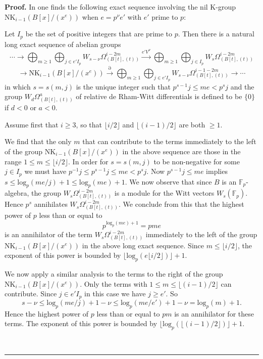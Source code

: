 \documentclass[reqno,11pt,letterpaper]{amsart}
\theoremstyle{plain}
\numberwithin{equation}{subsection}
\theoremstyle{remark}
\theoremstyle{plain}
\theoremstyle{definition}\newtheorem*{notation}{Notation}
\newenvironment{proof}[1][Proof]{\noindent\textbf{#1.} }{\ \rule{0.5em}{0.5em}}
\newcommand{\RK}{\mathrm{K}}
\newcommand{\RNK}{\mathrm{NK}}
\begin{document}
\begin{proof} In \cite[Corollary 14]{HesseHandbook} one finds the following exact sequence involving the  nil $\RK$-group $\RNK_{i-1}( B[x]/(x^e) )$ when $e = p^{\nu} e'$ with $e'$ prime to $p$:

  Let $I_p$ be the set of positive integers that are prime to $p$.  
  Then there is a natural long exact sequence
of abelian groups 
$$
\cdots \rightarrow \bigoplus_{m \ge 1} \bigoplus_{j \in e' I_p} W_{s- \nu} 
\Omega_{(B[t], (t))}^{i - 2m}
\xrightarrow{e' V^\nu} \bigoplus_{m \ge 1} \bigoplus_{j \in I_p} W_{s} \Omega_{(B[t], (t))}^{i - 2m}$$
$$\xrightarrow{} \RNK_{i-1}(B[x]/(x^e) ) \xrightarrow{\partial} 
\bigoplus_{m \ge 1} \bigoplus_{j \in e' I_p} W_{s- \nu} \Omega_{(B[t], (t))}^{i - 1 - 2m}\xrightarrow{}  \cdots
$$
in which $s   = s(m,j)$ is the unique integer such that $p^{s-1} j \le me < p^s j$ and the group
$W_d \Omega_{(B[t], (t))}^a$ of relative de Rham-Witt differentials is defined to be $\{0\}$ if $d < 0$ or $a < 0$.  

Assume first that $i\geq 3$, so that $\lfloor i/2 \rfloor$ and $\lfloor (i-1)/2 \rfloor$ are both $\geq 1$. 

We find that the only $m$ that can contribute to the terms immediately to the left of the group $\RNK_{i-1}(B[x]/(x^e) )$ in the above sequence are those in the range
$1 \le m \le \lfloor i/2 \rfloor$.  In order for $s = s(m,j)$ to be non-negative for some $j \in I_p$ we must have $p^{-1} j \le p^{s-1} j \le me   < p^s j$.    Now $p^{s-1} j \le me$ implies
 $s \le  \mathrm{log}_p(me/j) + 1 \le \mathrm{log}_p(me)+1 $.  We now observe that since $B$ is an $\mathbb{F}_p$-algebra, the group $W_s \Omega_{(B[t], (t))}^{i - 2m}$ is a module for the Witt vectors $W_s(\mathbb{F}_p)$.  Hence $p^s$ annihilates $W_s \Omega_{(B[t], (t))}^{i - 2m}$. We conclude from this that the highest power of $p$ less than or equal to 
 $$
 p^{\mathrm{log}_p(me)+ 1} = pme
 $$
 is an annihilator of the term $W_s \Omega_{(B[t], (t))}^{i - 2m}$ immediately to the left of the group  $\RNK_{i-1}(B[x]/(x^e))$ in the above 
 long exact sequence.  Since $m \le \lfloor i/2 \rfloor$, the exponent of this power is bounded by
 $\lfloor \mathrm{log}_p(e\lfloor i/2\rfloor ) \rfloor +  1$.
  
 
 We now apply a similar analysis to the terms to the right of the group $\RNK_{i-1}(B[x]/(x^e) )$.  Only the terms with $1 \le m \le \lfloor (i-1)/2 \rfloor$ can contribute. Since $j \in e'I_p$ in this case we have $j \ge e'$.  So
 $$
 s - \nu \le  \mathrm{log}_p(me/j) + 1 - \nu \le \mathrm{log}_p(me/e')+1 - \nu =  
 \mathrm{log}_p(m)  + 1.
 $$  
Hence the  highest power of $p$ less than or equal to $pm$ is an annihilator for these terms.  The exponent of this power is bounded by $\lfloor \mathrm{log}_p(\lfloor (i-1)/2\rfloor) \rfloor + 1$. 
  

\end{proof}
\end{document}
